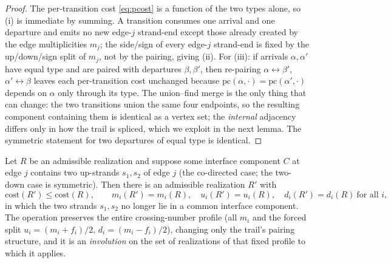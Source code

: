 \begin{proof}
The per-transition cost \eqref{eq:pcost} is a function of the two types
alone, so (i) is immediate by summing.  A transition consumes one arrival
and one departure and emits no new edge-$j$ strand-end except those already
created by the edge multiplicities $m_j$; the side/sign of every
edge-$j$ strand-end is fixed by the up/down/sign split of $m_j$, not by the
pairing, giving (ii).  For (iii): if arrivals $\alpha,\alpha'$ have equal
type and are paired with departures $\beta,\beta'$, then re-pairing
$\alpha\!\leftrightarrow\!\beta'$, $\alpha'\!\leftrightarrow\!\beta$ leaves
each per-transition cost unchanged because
$\mathrm{pc}(\alpha,\cdot)=\mathrm{pc}(\alpha',\cdot)$ depends on
$\alpha$ only through its type.  The union--find merge is the only thing
that can change: the two transitions union the same four endpoints, so the
resulting component containing them is identical as a vertex set; the
\emph{internal} adjacency differs only in how the trail is spliced, which we
exploit in the next lemma.  The symmetric statement for two departures of
equal type is identical.
\end{proof}

\begin{lemma}
\label{lem:reversal}
Let $R$ be an admissible realization and suppose some interface component
$C$ at edge $j$ contains two up-strands $s_1,s_2$ of edge $j$
\textup{(}the co-directed case; the two-down case is symmetric\textup{)}.
Then there is an admissible realization $R'$ with
\[
\mathrm{cost}(R')\le \mathrm{cost}(R),
\qquad
m_i(R')=m_i(R),\quad u_i(R')=u_i(R),\quad d_i(R')=d_i(R)\ \text{for all }i,
\]
in which the two strands $s_1,s_2$ no longer lie in a common interface
component.  The operation preserves the entire crossing-number profile
\textup{(}all $m_i$ and the forced split $u_i=(m_i+f_i)/2,\,
d_i=(m_i-f_i)/2$\textup{)}, changing only the trail's pairing structure, and
it is an \emph{involution} on the set of realizations of that fixed profile
to which it applies.
\end{lemma}

